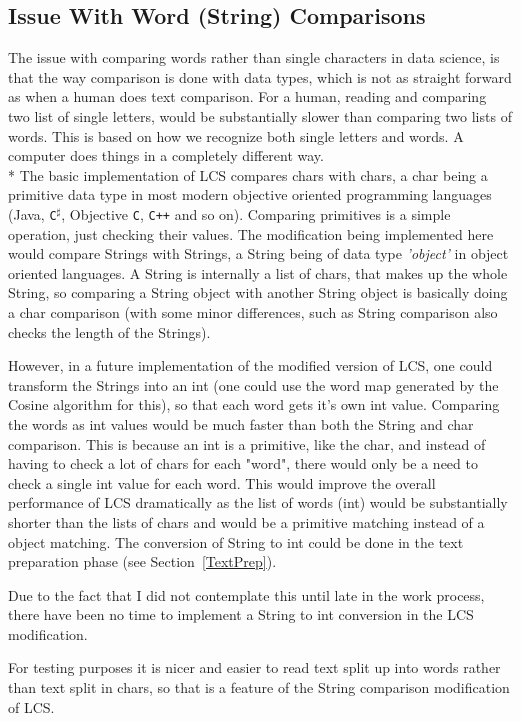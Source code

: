 \subsection{Issue With Word (String) Comparisons}
The issue with comparing words rather than single characters in data science, is that the way comparison is done with data types, which is not as straight forward as when a human does text comparison. For a human, reading and comparing two list of single letters, would be substantially slower than comparing two lists of words. This is based on how we recognize both single letters and words. A computer does things in a completely different way.\\* The basic implementation of LCS compares chars with chars, a char being a primitive data type in most modern objective oriented programming languages (Java, \verb!C!$^\sharp$, Objective \verb!C!, \verb!C++! and so on). Comparing primitives is a simple operation, just checking their values. The modification being implemented here would compare Strings with Strings, a String being of data type \textit{'object'} in object oriented languages. A String is internally a list of chars, that makes up the whole String, so comparing a String object with another String object is basically doing a char comparison (with some minor differences, such as String comparison also checks the length of the Strings).

However, in a future implementation of the modified version of LCS, one could transform the Strings into an int (one could use the word map generated by the Cosine algorithm for this), so that each word gets it's own int value. Comparing the words as int values would be much faster than both the String and char comparison. This is because an int is a primitive, like the char, and instead of having to check a lot of chars for each "word", there would only be a need to check a single int value for each word. This would improve the overall performance of LCS dramatically as the list of words (int) would be substantially shorter than the lists of chars and would be a primitive matching instead of a object matching. 
The conversion of String to int could be done in the text preparation phase (see Section~\ref{TextPrep}).

Due to the fact that I did not contemplate this until late in the work process, there have been no time to implement a String to int conversion in the LCS modification.

For testing purposes it is nicer and easier to read text split up into words rather than text split in chars, so that is a feature of the String comparison modification of LCS. 

